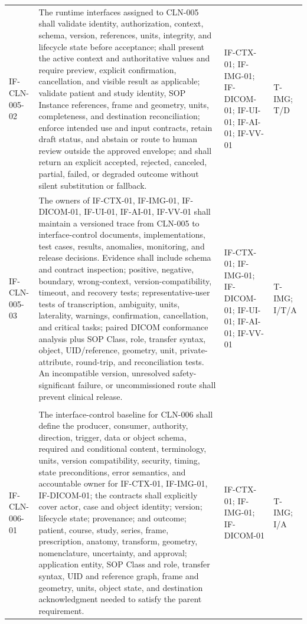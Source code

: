 \documentclass[11pt,letterpaper]{article}
\begin{document}
\begin{scriptsize}
\begin{longtable}{@{}L{0.14\textwidth}L{0.49\textwidth}L{0.19\textwidth}L{0.10\textwidth}@{}}
\addlinespace[2pt]
\mbox{IF-CLN-005-02} & The runtime interfaces assigned to CLN-005 shall validate identity, authorization, context, schema, version, references, units, integrity, and lifecycle state before acceptance; shall present the active context and authoritative values and require preview, explicit confirmation, cancellation, and visible result as applicable; validate patient and study identity, SOP Instance references, frame and geometry, units, completeness, and destination reconciliation; enforce intended use and input contracts, retain draft status, and abstain or route to human review outside the approved envelope; and shall return an explicit accepted, rejected, canceled, partial, failed, or degraded outcome without silent substitution or fallback. & IF-CTX-01; IF-IMG-01; IF-DICOM-01; IF-UI-01; IF-AI-01; IF-VV-01 & T-IMG; T\slash\allowbreak{}D \\
\addlinespace[2pt]
\mbox{IF-CLN-005-03} & The owners of IF-CTX-01, IF-IMG-01, IF-DICOM-01, IF-UI-01, IF-AI-01, IF-VV-01 shall maintain a versioned trace from CLN-005 to interface-control documents, implementations, test cases, results, anomalies, monitoring, and release decisions. Evidence shall include schema and contract inspection; positive, negative, boundary, wrong-context, version-compatibility, timeout, and recovery tests; representative-user tests of transcription, ambiguity, units, laterality, warnings, confirmation, cancellation, and critical tasks; paired DICOM conformance analysis plus SOP Class, role, transfer syntax, object, UID\slash\allowbreak{}reference, geometry, unit, private-attribute, round-trip, and reconciliation tests. An incompatible version, unresolved safety-significant failure, or uncommissioned route shall prevent clinical release. & IF-CTX-01; IF-IMG-01; IF-DICOM-01; IF-UI-01; IF-AI-01; IF-VV-01 & T-IMG; I\slash\allowbreak{}T\slash\allowbreak{}A \\
\addlinespace[2pt]
 \\
\addlinespace[2pt]
\mbox{IF-CLN-006-01} & The interface-control baseline for CLN-006 shall define the producer, consumer, authority, direction, trigger, data or object schema, required and conditional content, terminology, units, version compatibility, security, timing, state preconditions, error semantics, and accountable owner for IF-CTX-01, IF-IMG-01, IF-DICOM-01; the contracts shall explicitly cover actor, case and object identity; version; lifecycle state; provenance; and outcome; patient, course, study, series, frame, prescription, anatomy, transform, geometry, nomenclature, uncertainty, and approval; application entity, SOP Class and role, transfer syntax, UID and reference graph, frame and geometry, units, object state, and destination acknowledgment needed to satisfy the parent requirement. & IF-CTX-01; IF-IMG-01; IF-DICOM-01 & T-IMG; I\slash\allowbreak{}A \\

\end{longtable}
\end{scriptsize}
\end{document}
